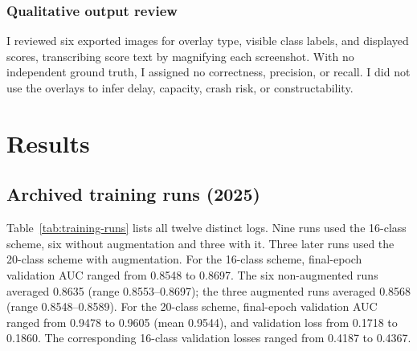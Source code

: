 \documentclass[11pt]{article}
\begin{document}
\subsubsection*{Qualitative output review}
I reviewed six exported images for overlay type, visible class labels, and displayed scores, transcribing score text by magnifying each screenshot. With no independent ground truth, I assigned no correctness, precision, or recall. I did not use the overlays to infer delay, capacity, crash risk, or constructability.

\section{Results}

\subsection{Archived training runs (2025)}
Table~\ref{tab:training-runs} lists all twelve distinct logs. Nine runs used the 16-class scheme, six without augmentation and three with it. Three later runs used the 20-class scheme with augmentation. For the 16-class scheme, final-epoch validation AUC ranged from 0.8548 to 0.8697. The six non-augmented runs averaged 0.8635 (range 0.8553--0.8697); the three augmented runs averaged 0.8568 (range 0.8548--0.8589). For the 20-class scheme, final-epoch validation AUC ranged from 0.9478 to 0.9605 (mean 0.9544), and validation loss from 0.1718 to 0.1860. The corresponding 16-class validation losses ranged from 0.4187 to 0.4367.
\end{document}

